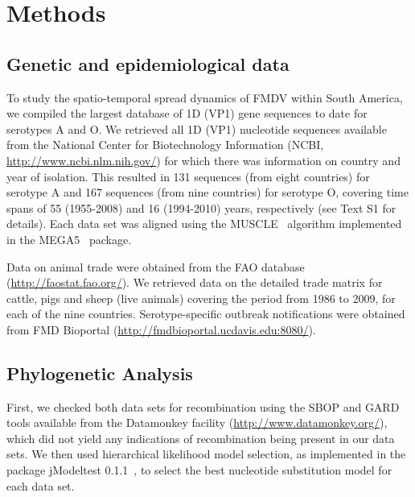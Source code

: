 \documentclass[10pt]{article}
\begin{document}
\section*{Methods}

\subsection*{Genetic and epidemiological data}

To study the spatio-temporal spread dynamics of FMDV within South America, we compiled the largest database of 1D (VP1) gene sequences to date for serotypes A and O.
We retrieved all 1D (VP1) nucleotide sequences available from the National Center for Biotechnology Information (NCBI, \url{ http://www.ncbi.nlm.nih.gov/}) for which there was information on country and year of isolation.
This resulted in 131 sequences (from eight countries) for serotype A and 167 sequences (from nine countries) for serotype O, covering time spans of 55 (1955-2008) and 16 (1994-2010) years, respectively (see Text S1 for details).
Each data set was aligned using the MUSCLE~\cite{muscle} algorithm implemented in the MEGA5~\cite{MEGA} package.

Data on animal trade were obtained from the FAO database (\url{http://faostat.fao.org/}).
We retrieved data on the detailed trade matrix for cattle, pigs and sheep (live animals) covering the period from 1986 to 2009, for each of the nine countries.
Serotype-specific outbreak notifications were obtained from FMD Bioportal (\url{http://fmdbioportal.ucdavis.edu:8080/}).

\subsection*{Phylogenetic Analysis}

First, we checked both data sets for recombination using the SBOP and GARD~\cite{sbpgard} tools available from the Datamonkey facility (\url{http://www.datamonkey.org/}), which did not yield any indications of recombination being present in our data sets.
We then used hierarchical likelihood model selection, as implemented in the package jModeltest 0.1.1~\cite{jmodel}, to select the best nucleotide substitution model for each data set.
\end{document}
